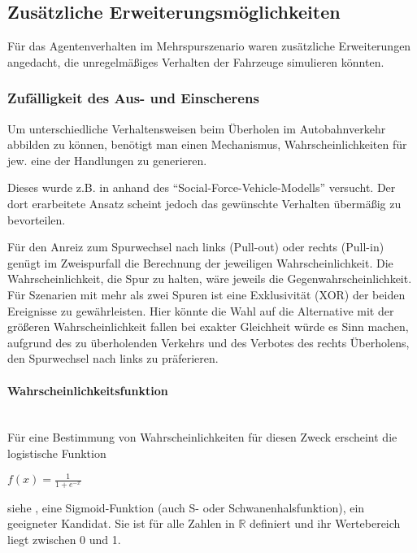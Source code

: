 


\subsection{Zusätzliche Erweiterungsmöglichkeiten}
\label{sec:additional-extensions}

Für das Agentenverhalten im Mehrspurszenario waren zusätzliche Erweiterungen angedacht, die unregelmäßiges Verhalten der Fahrzeuge simulieren könnten.


\subsubsection{Zufälligkeit des Aus- und Einscherens}
\label{sec:pullout-pullin}

Um unterschiedliche Verhaltensweisen beim Überholen im Autobahnverkehr abbilden zu können, benötigt man einen Mechanismus, Wahrscheinlichkeiten für jew. eine der Handlungen zu generieren.

Dieses wurde z.B. in \cite{dat-ba} anhand des \enquote{Social-Force-Vehicle-Modells} versucht. 
Der dort erarbeitete Ansatz scheint jedoch das gewünschte Verhalten übermäßig zu bevorteilen.

Für den Anreiz zum Spurwechsel nach links (Pull-out) oder rechts (Pull-in) genügt im Zweispurfall die Berechnung der jeweiligen Wahrscheinlichkeit.
Die Wahrscheinlichkeit, die Spur zu halten, wäre jeweils die Gegenwahrscheinlichkeit.
\\
Für Szenarien mit mehr als zwei Spuren ist eine Exklusivität (XOR) der beiden Ereignisse zu gewährleisten.
Hier könnte die Wahl auf die Alternative mit der größeren Wahrscheinlichkeit fallen bei exakter Gleichheit würde es Sinn machen, aufgrund des zu überholenden Verkehrs und des Verbotes des rechts Überholens, den Spurwechsel nach links zu präferieren.

\paragraph*{Wahrscheinlichkeitsfunktion} 
\hfill \\
Für eine Bestimmung von Wahrscheinlichkeiten für diesen Zweck erscheint die logistische Funktion  
\begin{center}
$ f(x) = \frac{1}{1 + e^{-x}} $ 
\end{center}
siehe \cite{logistic-function}, eine Sigmoid-Funktion (auch S- oder Schwanenhalsfunktion), ein geeigneter Kandidat. 
Sie ist für alle Zahlen in $ \mathbb{R} $ definiert und ihr Wertebereich liegt zwischen 0 und 1.

